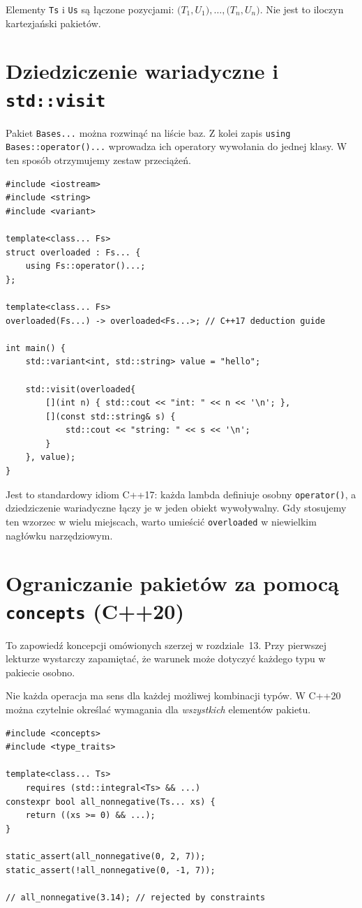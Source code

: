 Elementy \texttt{Ts} i \texttt{Us} są łączone pozycjami:
$\bigl(T_1,U_1\bigr),\ldots,\bigl(T_n,U_n\bigr)$.
Nie jest to iloczyn kartezjański pakietów.

\section{Dziedziczenie wariadyczne i \texttt{std::visit}}
\label{sec:variadic-overloaded}

Pakiet \texttt{Bases...} można rozwinąć na liście baz.
Z kolei zapis \texttt{using Bases::operator()...}
wprowadza ich operatory wywołania do jednej klasy.
W ten sposób otrzymujemy zestaw przeciążeń.

\begin{lstlisting}
#include <iostream>
#include <string>
#include <variant>

template<class... Fs>
struct overloaded : Fs... {
    using Fs::operator()...;
};

template<class... Fs>
overloaded(Fs...) -> overloaded<Fs...>; // C++17 deduction guide

int main() {
    std::variant<int, std::string> value = "hello";

    std::visit(overloaded{
        [](int n) { std::cout << "int: " << n << '\n'; },
        [](const std::string& s) {
            std::cout << "string: " << s << '\n';
        }
    }, value);
}
\end{lstlisting}

Jest to standardowy idiom C++17: każda lambda definiuje
osobny \texttt{operator()}, a dziedziczenie wariadyczne
łączy je w jeden obiekt wywoływalny. Gdy stosujemy ten wzorzec
w wielu miejscach, warto umieścić \texttt{overloaded} w
niewielkim nagłówku narzędziowym.

\section{Ograniczanie pakietów za pomocą \texttt{concepts} (C++20)}
\label{sec:variadic-concepts}

To zapowiedź koncepcji omówionych szerzej w rozdziale~13.
Przy pierwszej lekturze wystarczy zapamiętać, że warunek może
dotyczyć każdego typu w pakiecie osobno.

Nie każda operacja ma sens dla każdej możliwej kombinacji
typów. W C++20 można czytelnie określać wymagania dla
\emph{wszystkich} elementów pakietu.

\begin{lstlisting}
#include <concepts>
#include <type_traits>

template<class... Ts>
    requires (std::integral<Ts> && ...)
constexpr bool all_nonnegative(Ts... xs) {
    return ((xs >= 0) && ...);
}

static_assert(all_nonnegative(0, 2, 7));
static_assert(!all_nonnegative(0, -1, 7));

// all_nonnegative(3.14); // rejected by constraints
\end{lstlisting}

